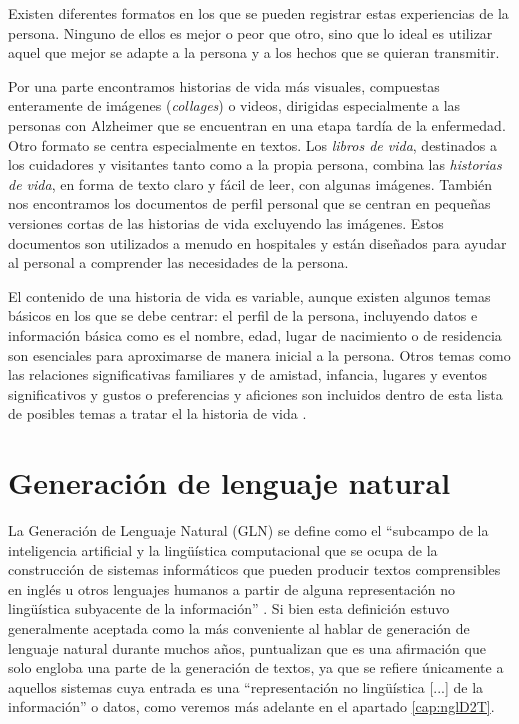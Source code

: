 Existen diferentes formatos en los que se pueden registrar estas experiencias de la persona. Ninguno de ellos es mejor o peor que otro, sino que lo ideal es utilizar aquel que mejor se adapte a la persona y a los hechos que se quieran transmitir.

Por una parte encontramos historias de vida más visuales, compuestas enteramente de imágenes (\textit{collages}) o videos, dirigidas especialmente a las personas con Alzheimer que se encuentran en una etapa tardía de la enfermedad. Otro formato se centra especialmente en textos. Los \textit{libros de vida}, destinados a los cuidadores y visitantes tanto como a la propia persona, combina las \textit{historias de vida}, en forma de texto claro y fácil de leer, con algunas imágenes. También nos encontramos los documentos de perfil personal que se centran en pequeñas versiones cortas de las historias de vida excluyendo las imágenes. Estos documentos son utilizados a menudo en hospitales y están diseñados para ayudar al personal a comprender las necesidades de la persona.

El contenido de una historia de vida es variable, aunque existen algunos temas básicos en los que se debe centrar: el perfil de la persona, incluyendo datos e información básica como es el nombre, edad, lugar de nacimiento o de residencia son esenciales para aproximarse de manera inicial a la persona. Otros temas como las relaciones significativas familiares y de amistad, infancia, lugares y eventos significativos y gustos o preferencias y aficiones son incluidos dentro de esta lista de posibles temas a tratar el la historia de vida \citep{thompsonlifestory}.

\section{Generación de lenguaje natural}

La Generación de Lenguaje Natural (GLN) se define como el ``subcampo de la inteligencia artificial y la lingüística computacional que se ocupa de la construcción de sistemas informáticos que pueden producir textos comprensibles en inglés u otros lenguajes humanos a partir de alguna representación no lingüística subyacente de la información''  \citep{reiter1997building}. Si bien esta definición estuvo generalmente aceptada como la más conveniente al hablar de generación de lenguaje natural durante muchos años, \cite{gatt2018survey} puntualizan que es una afirmación que solo engloba una parte de la generación de textos, ya que se refiere únicamente a aquellos sistemas cuya entrada es una ``representación no lingüística [...] de la información'' o datos, como veremos más adelante en el apartado \ref{cap:nglD2T}.

